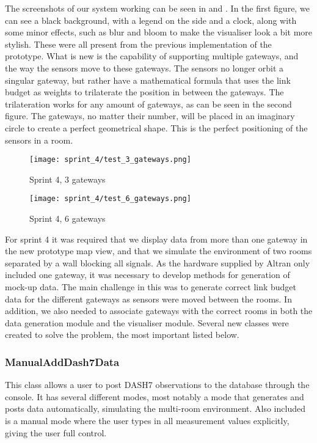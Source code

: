 \documentclass[../document]{subfiles}
\begin{document}
The screenshots of our system working can be seen in  and  . In the first figure, we can see a black background, with a legend on the side and a clock, along with some minor effects, such as blur and bloom to make the visualiser look a bit more stylish. These were all present from the previous implementation of the prototype. What is new is the capability of supporting multiple gateways, and the way the sensors move to these gateways. The sensors no longer orbit a singular gateway, but rather have a mathematical formula that uses the link budget as weights to trilaterate the position in between the gateways. The trilateration works for any amount of gateways, as can be seen in the second figure. The gateways, no matter their number, will be placed in an imaginary circle to create a perfect geometrical shape. This is the perfect positioning of the sensors in a room.

\begin{figure}[H]
\centering
\texttt{[image: sprint\_4/test\_3\_gateways.png]}
\caption{Sprint 4, 3 gateways}
\label{fig:sprint4_1}
\end{figure}

\begin{figure}[H]
\centering
\texttt{[image: sprint\_4/test\_6\_gateways.png]}
\caption{Sprint 4, 6 gateways}
\label{fig:sprint4_2}
\end{figure}

For sprint 4 it was required that we display data from more than one gateway in the new prototype map view, and that we simulate the environment of two rooms separated by a wall blocking all signals. As the hardware supplied by \gls{Altran} only included one gateway, it was necessary to develop methods for generation of mock-up data. The main challenge in this was to generate correct link budget data for the different gateways as sensors were moved between the rooms. In addition, we also needed to associate gateways with the correct rooms in both the data generation module and the visualiser module. Several new classes were created to solve the problem, the most important listed below.

\subsubsection{ManualAddDash7Data}
This class allows a user to post DASH7 observations to the database through the console. It has several different modes, most notably a mode that generates and posts data automatically, simulating the multi-room environment. Also included is a manual mode where the user types in all measurement values explicitly, giving the user full control.
\end{document}
